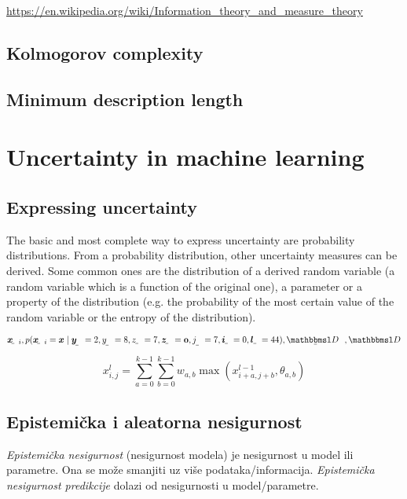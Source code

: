 \documentclass{article}
\begin{document}
\url{https://en.wikipedia.org/wiki/Information_theory_and_measure_theory}


\subsection{Kolmogorov complexity}


\subsection{Minimum description length}



\section{Uncertainty in machine learning}


\subsection{Expressing uncertainty}

The basic and most complete way to express uncertainty are probability distributions. From a probability distribution, other uncertainty measures can be derived. Some common ones are the distribution of a derived random variable (a random variable which is a function of the original one), a parameter or a property of the distribution (e.g. the probability of the most certain value of the random variable or the entropy of the distribution).

$\rvec{x}_i, p(\rvec{x}_i=\vec x\mid \rvec{y}=2, \rvar y=8, \rvar{z}=7, \rvec{z}=\vec 0, \rvar j=7, \rvec i=0, \rvec l=44), \rset{D}, \set{D}$

\begin{equation}\label{eq:conv_relu}
x^l_{i, j} = \sum_{a=0}^{k-1} \sum_{b=0}^{k-1} w_{a,b} \max(x^{l-1}_{i+a, j+b}, \theta_{a,b})
\end{equation}



\subsection{Epistemička i aleatorna nesigurnost}

\emph{Epistemička nesigurnost} (nesigurnost modela) je nesigurnost u model ili parametre. Ona se može smanjiti uz više podataka/informacija. \emph{Epistemička nesigurnost predikcije} dolazi od nesigurnosti u model/parametre.
\end{document}
